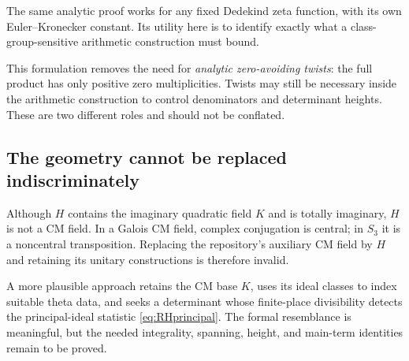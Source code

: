 The same analytic proof works for any fixed Dedekind zeta function, with its own Euler--Kronecker constant. Its utility here is to identify exactly what a class-group-sensitive arithmetic construction must bound.

This formulation removes the need for \emph{analytic zero-avoiding twists}: the full product has only positive zero multiplicities. Twists may still be necessary inside the arithmetic construction to control denominators and determinant heights. These are two different roles and should not be conflated.

\subsection{The geometry cannot be replaced indiscriminately}

Although \(H\) contains the imaginary quadratic field \(K\) and is totally imaginary, \(H\) is not a CM field. In a Galois CM field, complex conjugation is central; in \(S_3\) it is a noncentral transposition. Replacing the repository's auxiliary CM field by \(H\) and retaining its unitary constructions is therefore invalid.

A more plausible approach retains the CM base \(K\), uses its ideal classes to index suitable theta data, and seeks a determinant whose finite-place divisibility detects the principal-ideal statistic \eqref{eq:RHprincipal}. The formal resemblance is meaningful, but the needed integrality, spanning, height, and main-term identities remain to be proved.
